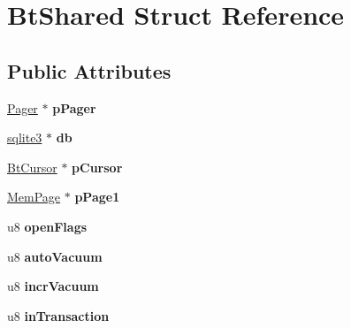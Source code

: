 \hypertarget{struct_bt_shared}{\section{Bt\-Shared Struct Reference}
\label{struct_bt_shared}
}
\subsection*{Public Attributes}
\begin{DoxyCompactItemize}
\item 
\hypertarget{struct_bt_shared_ab79703fc47a16446274457588d7eb989}{\hyperlink{struct_pager}{Pager} $\ast$ {\bfseries p\-Pager}}\label{struct_bt_shared_ab79703fc47a16446274457588d7eb989}

\item 
\hypertarget{struct_bt_shared_a93dafa672793f6117a336d5987951c8e}{\hyperlink{structsqlite3}{sqlite3} $\ast$ {\bfseries db}}\label{struct_bt_shared_a93dafa672793f6117a336d5987951c8e}

\item 
\hypertarget{struct_bt_shared_a8f8b52dee390e5606e8e2a8511530de7}{\hyperlink{struct_bt_cursor}{Bt\-Cursor} $\ast$ {\bfseries p\-Cursor}}\label{struct_bt_shared_a8f8b52dee390e5606e8e2a8511530de7}

\item 
\hypertarget{struct_bt_shared_a296dffd1c698ec175fee109718f32d5d}{\hyperlink{struct_mem_page}{Mem\-Page} $\ast$ {\bfseries p\-Page1}}\label{struct_bt_shared_a296dffd1c698ec175fee109718f32d5d}

\item 
\hypertarget{struct_bt_shared_a8fbc250e23d7c417ccfec8cceb08329d}{u8 {\bfseries open\-Flags}}\label{struct_bt_shared_a8fbc250e23d7c417ccfec8cceb08329d}

\item 
\hypertarget{struct_bt_shared_a770c4f6244d4350f27029cb909902a61}{u8 {\bfseries auto\-Vacuum}}\label{struct_bt_shared_a770c4f6244d4350f27029cb909902a61}

\item 
\hypertarget{struct_bt_shared_a8d8ba06335a63d8a36294a0f1ae8377a}{u8 {\bfseries incr\-Vacuum}}\label{struct_bt_shared_a8d8ba06335a63d8a36294a0f1ae8377a}

\item 
\hypertarget{struct_bt_shared_aeaa6c0f33b83434ecee4bd8c4c8df48e}{u8 {\bfseries in\-Transaction}}\label{struct_bt_shared_aeaa6c0f33b83434ecee4bd8c4c8df48e}


\end{DoxyCompactItemize}
